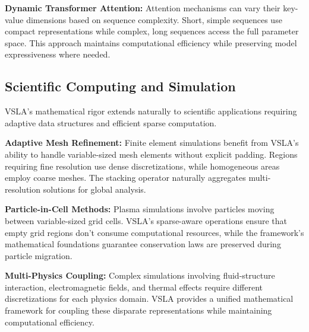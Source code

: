 \textbf{Dynamic Transformer Attention:} Attention mechanisms can vary their key-value dimensions based on sequence complexity. Short, simple sequences use compact representations while complex, long sequences access the full parameter space. This approach maintains computational efficiency while preserving model expressiveness where needed.

\subsection{Scientific Computing and Simulation}

VSLA's mathematical rigor extends naturally to scientific applications requiring adaptive data structures and efficient sparse computation.

\textbf{Adaptive Mesh Refinement:} Finite element simulations benefit from VSLA's ability to handle variable-sized mesh elements without explicit padding. Regions requiring fine resolution use dense discretizations, while homogeneous areas employ coarse meshes. The stacking operator naturally aggregates multi-resolution solutions for global analysis.

\textbf{Particle-in-Cell Methods:} Plasma simulations involve particles moving between variable-sized grid cells. VSLA's sparse-aware operations ensure that empty grid regions don't consume computational resources, while the framework's mathematical foundations guarantee conservation laws are preserved during particle migration.

\textbf{Multi-Physics Coupling:} Complex simulations involving fluid-structure interaction, electromagnetic fields, and thermal effects require different discretizations for each physics domain. VSLA provides a unified mathematical framework for coupling these disparate representations while maintaining computational efficiency.

